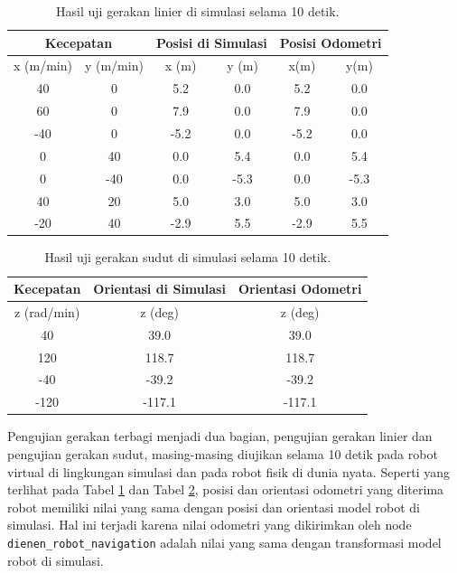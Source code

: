 \begin{table}
  \caption{Hasil uji gerakan linier di simulasi selama 10 detik.}
  \label{tab:hasilujiliniersimulasi}
  \centering
  \begin{tabular}{cc|cc|cc}
    \toprule
    \multicolumn{2}{c|}{Kecepatan} &
    \multicolumn{2}{|c|}{Posisi di Simulasi} &
    \multicolumn{2}{|c}{Posisi Odometri} \\
    \midrule
    x (m/min) & y (m/min) & x (m) & y (m) & x(m)  & y(m) \\
    \midrule
    40        & 0         & 5.2   & 0.0   & 5.2   & 0.0 \\
    60        & 0         & 7.9   & 0.0   & 7.9   & 0.0 \\
    -40       & 0         & -5.2  & 0.0   & -5.2  & 0.0 \\
    0         & 40        & 0.0   & 5.4   & 0.0   & 5.4 \\
    0         & -40       & 0.0   & -5.3  & 0.0   & -5.3 \\
    40        & 20        & 5.0   & 3.0   & 5.0   & 3.0 \\
    -20       & 40        & -2.9  & 5.5   & -2.9  & 5.5 \\
    \bottomrule
  \end{tabular}
\end{table}

\begin{table}
  \caption{Hasil uji gerakan sudut di simulasi selama 10 detik.}
  \label{tab:hasilujisudutsimulasi}
  \centering
  \begin{tabular}{c|c|c}
    \toprule
    Kecepatan   & Orientasi di Simulasi & Orientasi Odometri \\
    \midrule
    z (rad/min) & z (deg)               & z (deg) \\
    \midrule
    40          & 39.0                  & 39.0 \\
    120         & 118.7                 & 118.7 \\
    -40         & -39.2                 & -39.2 \\
    -120        & -117.1                & -117.1 \\
    \bottomrule
  \end{tabular}
\end{table}

Pengujian gerakan terbagi menjadi dua bagian, pengujian gerakan linier dan pengujian gerakan sudut, masing-masing diujikan selama 10 detik pada robot virtual di lingkungan simulasi dan pada robot fisik di dunia nyata.
Seperti yang terlihat pada Tabel \ref{tab:hasilujiliniersimulasi} dan Tabel \ref{tab:hasilujisudutsimulasi}, posisi dan orientasi odometri yang diterima robot memiliki nilai yang sama dengan posisi dan orientasi model robot di simulasi.
Hal ini terjadi karena nilai odometri yang dikirimkan oleh node \lstinline{dienen_robot_navigation} adalah nilai yang sama dengan transformasi model robot di simulasi.

